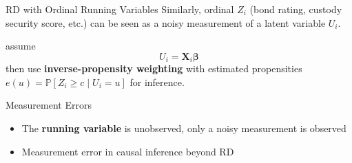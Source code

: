 \begin{frame}{RD with Ordinal Running Variables}
     Similarly, ordinal $Z_i$ {\footnotesize(bond rating, custody security score, etc.)} can be seen as a noisy measurement of a latent variable $U_i$.

     \citet{li2021regression} assume 
     $$
        U_i = \mathbf{X}_i \mathbf{\beta}
     $$
     then use \textcolor{mygreen}{\textbf{inverse-propensity weighting}} with estimated propensities $e(u)=\mathbb{P}\left[ Z_i\geq c\mid U_i=u \right]$ for inference.


\end{frame}

\begin{frame}{Measurement Errors}
    \begin{itemize}
        \item The \textcolor{mygreen}{\textbf{running variable}} is unobserved, only a noisy measurement is observed
        
        \citet{bartalotti2021correction,davezies2017regression,dong2021can,pei2017devil}
        \item Measurement error in causal inference beyond RD
        
        \citet{pearl2012measurement,kuroki2014measurement,jiang2020measurement}
    \end{itemize}
    
\end{frame}

